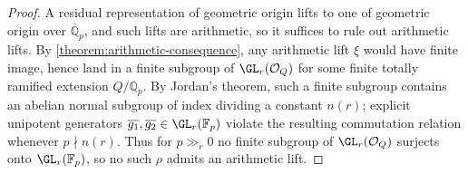 \begin{proof}
  A residual representation of geometric origin lifts to one of geometric
  origin over $\overline{\mathbb{Q}}_p$, and such lifts are arithmetic, so it
  suffices to rule out arithmetic lifts.
  By \cref{theorem:arithmetic-consequence}, any arithmetic lift $\xi$ would have
  finite image, hence land in a finite subgroup of $\GL_r(\mathcal{O}_Q)$ for
  some finite totally ramified extension $Q/\mathbb{Q}_p$.
  By Jordan's theorem, such a finite subgroup contains an abelian normal
  subgroup of index dividing a constant $n(r)$; explicit unipotent generators
  $\overline{g_1}, \overline{g_2} \in \GL_r(\mathbb{F}_p)$ violate the resulting
  commutation relation whenever $p \nmid n(r)$.
  Thus for $p \gg_r 0$ no finite subgroup of $\GL_r(\mathcal{O}_Q)$ surjects
  onto $\GL_r(\mathbb{F}_p)$, so no such $\rho$ admits an arithmetic lift.
\end{proof}
